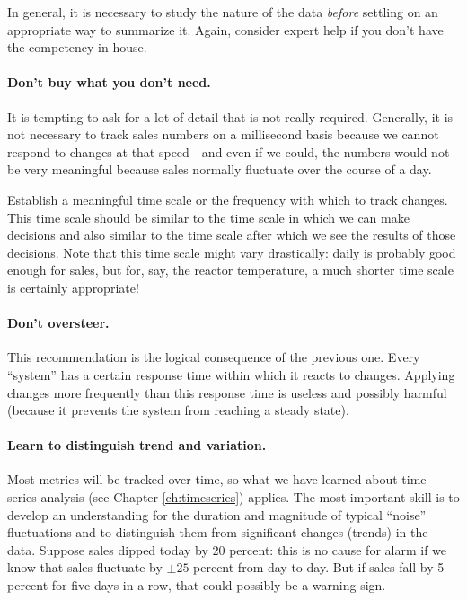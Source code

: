 In general, it is necessary to study the nature of the data
\emph{before} settling on an appropriate way to summarize it. Again,
consider expert help if you don't have the competency in-house.

\paragraph{Don't buy what you don't need.}
It is tempting to ask for a lot of detail that is not really required.
Generally, it is not necessary to track sales numbers on a millisecond
basis because we cannot respond to changes at that speed---and even
if we could, the numbers would not be very meaningful because sales
normally fluctuate over the course of a day.

Establish a meaningful time scale or the frequency with which to track
changes. This time scale should be similar to the time scale in which
we can make decisions and also similar to the time scale after which
we see the results of those decisions. Note that this time scale might
vary drastically: daily is probably good enough for sales, but for,
say, the reactor temperature, a much shorter time scale is certainly
appropriate!

\paragraph{Don't oversteer.}
This recommendation is the logical consequence of the previous one.
Every ``system'' has a certain response time within which it reacts to
changes. Applying changes more frequently than this response time is
useless and possibly harmful (because it prevents the system from
reaching a steady state).

\paragraph{Learn to distinguish trend and variation.} Most metrics will be tracked over time, so what we have learned
about time-series analysis (see Chapter \ref{ch:timeseries}) applies.
The most important skill is to develop an understanding for the duration
and magnitude of typical ``noise'' fluctuations and to distinguish
them from significant changes (trends) in the data.  Suppose sales
dipped today by 20 percent: this is no cause for alarm if we know that
sales fluctuate by $\pm 25$ percent from day to day. But if sales fall
by 5 percent for five days in a row, that could possibly be a warning
sign.

